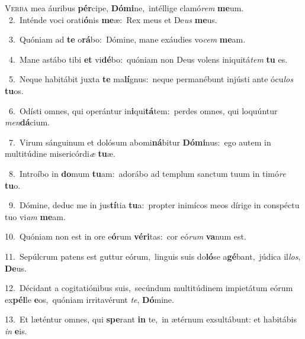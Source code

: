 \lettrine{\initial\textcolor{\initialcolor}{V}}{erba} mea áuribus \textbf{pér}\-cipe, \textbf{Dó}\-\textbf{mi}ne,~\star intéllige clamó\textit{rem} \textbf{me}\-um.\\
{\numbfont\textcolor{\numbcolor}{~2.}}~Inténde voci orati\-\textbf{ó}\-nis \textbf{me}\-æ:~\star Rex meus et De\textit{us} \textbf{me}\-us.\par
{\numbfont\textcolor{\numbcolor}{~3.}}~Quóniam ad \textbf{te} o\-\textbf{rá}\-bo:~\star Dómine, mane exáudies vo\textit{cem} \textbf{me}\-am.\par
{\numbfont\textcolor{\numbcolor}{~4.}}~Mane astábo tibi \textbf{et} vi\-\textbf{dé}\-bo:~\star quóniam non Deus volens iniquitá\textit{tem} \textbf{tu} es.\par
{\numbfont\textcolor{\numbcolor}{~5.}}~Neque habitábit juxta \textbf{te} ma\-\textbf{lí}\-gnus:~\star neque permanébunt injústi ante ócu\textit{los} \textbf{tu}\-os.\par
{\numbfont\textcolor{\numbcolor}{~6.}}~Odísti omnes, qui operántur in\-\textbf{i}\-qui\-\textbf{tá}\-tem:~\star perdes omnes, qui loquúntur \textit{men}\-\textbf{dá}cium.\par
{\numbfont\textcolor{\numbcolor}{~7.}}~Virum sánguinum et dolósum abomi\-\textbf{ná}\-bitur \textbf{Dó}\-\textbf{mi}nus:~\star ego autem in multitúdine misericórdi\textit{æ} \textbf{tu}\-æ.\par
{\numbfont\textcolor{\numbcolor}{~8.}}~Introíbo in \textbf{do}\-mum \textbf{tu}\-am:~\star adorábo ad templum sanctum tuum in timó\textit{re} \textbf{tu}\-o.\par
{\numbfont\textcolor{\numbcolor}{~9.}}~Dómine, deduc me in jus\-\textbf{tí}\-tia \textbf{tu}\-a:~\star propter inimícos meos dírige in conspéctu tuo vi\textit{am} \textbf{me}\-am.\par
{\numbfont\textcolor{\numbcolor}{10.}}~Quóniam non est in ore e\-\textbf{ó}\-rum \textbf{vé}\-\textbf{ri}tas:~\star cor eó\textit{rum} \textbf{va}\-num est.\par
{\numbfont\textcolor{\numbcolor}{11.}}~Sepúlcrum patens est guttur eórum,~\dagger linguis suis do\-\textbf{ló}\-se a\-\textbf{gé}\-bant,~\star júdica il\-\textit{los}\-, \textbf{De}\-us.\par
{\numbfont\textcolor{\numbcolor}{12.}}~Décidant a cogitatiónibus suis,~\dagger secúndum multitúdinem impietátum eórum ex\-\textbf{pél}\-le \textbf{e}\-os,~\star quóniam irritavérunt \textit{te}\-, \textbf{Dó}\-mine.\par
{\numbfont\textcolor{\numbcolor}{13.}}~Et læténtur omnes, qui \textbf{spe}\-rant \textbf{in} te,~\star in ætérnum exsultábunt: et habitábis \textit{in} \textbf{e}\-is.\par
